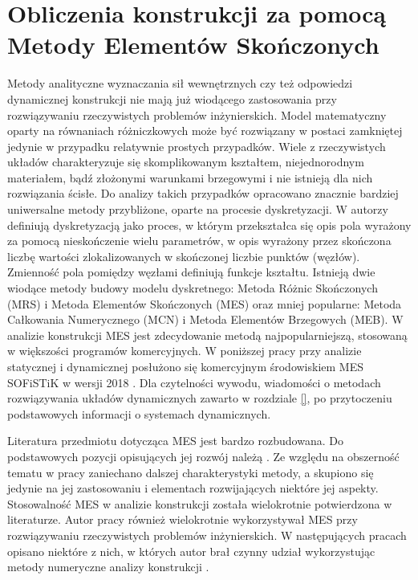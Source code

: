 \section{Obliczenia konstrukcji za pomocą Metody Elementów Skończonych} \label{sect:MES}
Metody analityczne wyznaczania sił wewnętrznych czy też odpowiedzi dynamicznej konstrukcji nie mają już wiodącego zastosowania przy rozwiązywaniu rzeczywistych problemów inżynierskich. Model matematyczny oparty na równaniach różniczkowych może być rozwiązany w postaci zamkniętej jedynie w przypadku relatywnie prostych przypadków. Wiele z rzeczywistych układów charakteryzuje się skomplikowanym kształtem, niejednorodnym materiałem, bądź złożonymi warunkami brzegowymi i nie istnieją dla nich rozwiązania ścisłe. Do analizy takich przypadków opracowano znacznie bardziej uniwersalne metody przybliżone, oparte na procesie dyskretyzacji. W \cite{Rakowski2016} autorzy definiują dyskretyzacją jako proces, w którym przekształca się opis pola wyrażony za pomocą nieskończenie wielu parametrów, w opis wyrażony przez skończona liczbę wartości zlokalizowanych w skończonej liczbie punktów (węzłów). Zmienność pola pomiędzy węzłami definiują funkcje kształtu. Istnieją dwie wiodące metody budowy modelu dyskretnego: Metoda Różnic Skończonych (MRS) i Metoda Elementów Skończonych (MES) oraz mniej popularne: Metoda Całkowania Numerycznego (MCN) i Metoda Elementów Brzegowych (MEB). W analizie konstrukcji MES jest zdecydowanie metodą najpopularniejszą, stosowaną w większości programów komercyjnych. W poniższej pracy przy analizie statycznej i dynamicznej posłużono się komercyjnym środowiskiem MES SOFiSTiK w wersji 2018 \cite{SOFISTIK2018,Hartmann2007}. Dla czytelności wywodu, wiadomości o metodach rozwiązywania układów dynamicznych zawarto w rozdziale \ref{}, po przytoczeniu podstawowych informacji o systemach dynamicznych. 

Literatura przedmiotu dotycząca MES jest bardzo rozbudowana. Do podstawowych pozycji opisujących jej rozwój należą \parencite{Kleiber1985,Hughes1987,Zienkiewicz2005,Rakowski2016,Langtangen2019}. Ze względu na obszerność tematu w pracy zaniechano dalszej charakterystyki metody, a skupiono się jedynie na jej zastosowaniu i elementach rozwijających niektóre jej aspekty. Stosowalność MES w analizie konstrukcji została wielokrotnie potwierdzona w literaturze. Autor pracy również wielokrotnie wykorzystywał MES przy rozwiązywaniu rzeczywistych problemów inżynierskich. W następujących pracach opisano niektóre z nich, w których autor brał czynny udział wykorzystując metody numeryczne analizy konstrukcji \parencite{Zotowski2016d,Zotowski2017a,Cudny2017,Zotowski2017h,Zotowski2018a,Zotowski2018d,Zotowski2018c,Binczyk2020a}.

